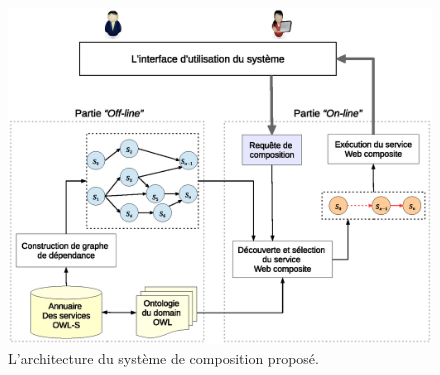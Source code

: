 \begin{figure}[h]
  \centering
  \includegraphics[width=1.2\textwidth, center]{figs/ch3/architecture.eps}
  \caption{L'architecture du système de composition proposé.}
  \label{fig:ch3/architecture}
\end{figure}
